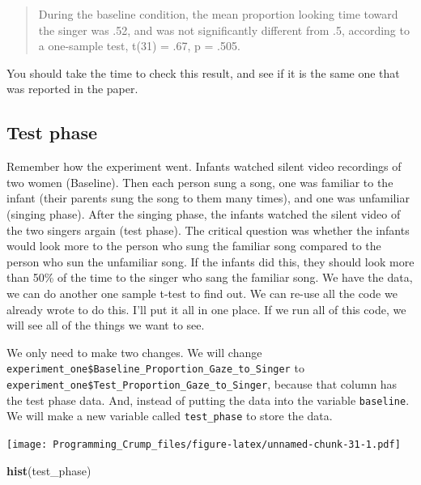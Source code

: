 \documentclass[]{book}
\newenvironment{Shaded}{\begin{snugshade}}{\end{snugshade}}
\newcommand{\KeywordTok}[1]{\textcolor[rgb]{0.13,0.29,0.53}{\textbf{{#1}}}}
\newcommand{\StringTok}[1]{\textcolor[rgb]{0.31,0.60,0.02}{{#1}}}
\newcommand{\NormalTok}[1]{{#1}}
\theoremstyle{definition}
\theoremstyle{definition}
\theoremstyle{definition}
\theoremstyle{remark}
\begin{document}
\begin{quote}
During the baseline condition, the mean proportion looking time toward
the singer was .52, and was not significantly different from .5,
according to a one-sample test, t(31) = .67, p = .505.
\end{quote}

You should take the time to check this result, and see if it is the same
one that was reported in the paper.

\subsection{Test phase}\label{test-phase}

Remember how the experiment went. Infants watched silent video
recordings of two women (Baseline). Then each person sung a song, one
was familiar to the infant (their parents sung the song to them many
times), and one was unfamiliar (singing phase). After the singing phase,
the infants watched the silent video of the two singers argain (test
phase). The critical question was whether the infants would look more to
the person who sung the familiar song compared to the person who sun the
unfamiliar song. If the infants did this, they should look more than
50\% of the time to the singer who sang the familiar song. We have the
data, we can do another one sample t-test to find out. We can re-use all
the code we already wrote to do this. I'll put it all in one place. If
we run all of this code, we will see all of the things we want to see.

We only need to make two changes. We will change
\texttt{experiment\_one\$Baseline\_Proportion\_Gaze\_to\_Singer} to
\texttt{experiment\_one\$Test\_Proportion\_Gaze\_to\_Singer}, because
that column has the test phase data. And, instead of putting the data
into the variable \texttt{baseline}. We will make a new variable called
\texttt{test\_phase} to store the data.

\begin{Shaded}
\end{Shaded}

\texttt{[image: Programming\_Crump\_files/figure-latex/unnamed-chunk-31-1.pdf]}

\begin{Shaded}
\begin{Highlighting}[]
\KeywordTok{hist}\NormalTok{(test_phase)}
\end{Highlighting}
\end{Shaded}
\end{document}
